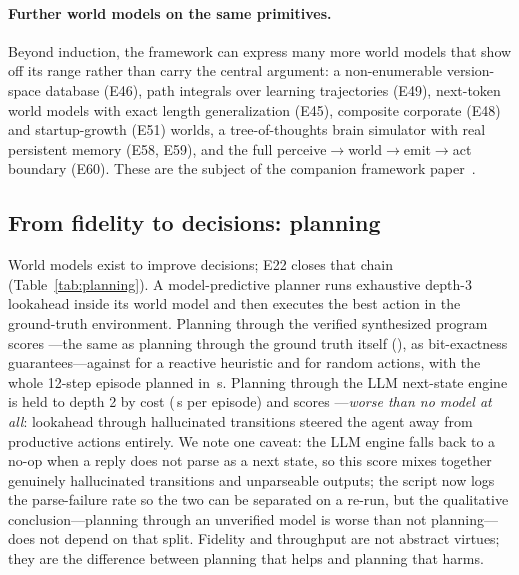\documentclass[11pt]{article}
\begin{document}
\paragraph{Further world models on the same primitives.} Beyond induction, the framework can express many more world models that show off its range rather than carry the central argument: a non-enumerable version-space database (E46), path integrals over learning trajectories (E49), next-token world models with exact length generalization (E45), composite corporate (E48) and startup-growth (E51) worlds, a tree-of-thoughts brain simulator with real persistent memory (E58, E59), and the full perceive$\to$world$\to$emit$\to$act boundary (E60). These are the subject of the companion framework paper~\cite{openworld_framework}.

\subsection{From fidelity to decisions: planning}\label{sec:planning}
World models exist to improve decisions; E22 closes that chain
(Table~\ref{tab:planning}). A model-predictive planner runs exhaustive
depth-3 lookahead inside its world model and then executes the best action in the
ground-truth environment. Planning through the verified synthesized program
scores \PlanCode---the same as planning through the ground truth
itself (\PlanOracle), as bit-exactness guarantees---against \PlanReactive{}
for a reactive heuristic and \PlanRandom{} for random actions, with the
whole 12-step episode planned in \PlanCodeSeconds\,s. Planning through the
LLM next-state engine is held to depth 2 by cost (\PlanLLMSeconds\,s per
episode) and scores \PlanLLM---\emph{worse than no model at all}: lookahead
through hallucinated transitions steered the agent away from productive
actions entirely. We note one caveat: the LLM engine falls back to a
no-op when a reply does not parse as a next state, so this score mixes together
genuinely hallucinated transitions and unparseable outputs; the script now
logs the parse-failure rate so the two can be separated on a re-run, but the
qualitative conclusion---planning through an unverified model is worse than not
planning---does not depend on that split. Fidelity and throughput are not
abstract virtues; they are the difference between planning that helps and
planning that harms.

\begin{table}[htb]\centering\small

\caption{E22: model-predictive lookahead on the sprint world, plans executed
in the ground-truth environment. Value function: shipped $-$ bugs $-$
0.5$\cdot$debt after 12 steps.}
\label{tab:planning}
\end{table}
\end{document}
